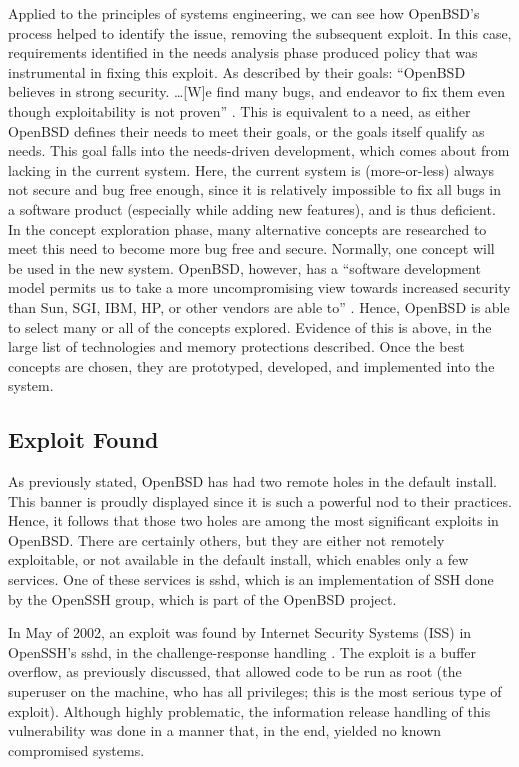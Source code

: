 \documentclass[12pt]{article}
\begin{document}
{Applied to the principles of systems engineering, we can see how OpenBSD's process helped to identify the issue, removing the subsequent exploit. In this case, requirements identified in the needs analysis phase produced policy that was instrumental in fixing this exploit. As described by their goals: ``OpenBSD believes in strong security. \ldots [W]e find many bugs, and endeavor to fix them even though exploitability is not proven'' \cite{openbsd-security}. This is equivalent to a need, as either OpenBSD defines their needs to meet their goals, or the goals itself qualify as needs. This goal falls into the needs-driven development, which comes about from lacking in the current system. Here, the current system is (more-or-less) always not secure and bug free enough, since it is relatively impossible to fix all bugs in a software product (especially while adding new features), and is thus deficient. In the concept exploration phase, many alternative concepts are researched to meet this need to become more bug free and secure. Normally, one concept will be used in the new system. OpenBSD, however, has a ``software development model permits us to take a more uncompromising view towards increased security than Sun, SGI, IBM, HP, or other vendors are able to'' \cite{openbsd-security}. Hence, OpenBSD is able to select many or all of the concepts explored. Evidence of this is above, in the large list of technologies and memory protections described. Once the best concepts are chosen, they are prototyped, developed, and implemented into the system.

\subsection*{Exploit Found}

As previously stated, OpenBSD has had two remote holes in the default install. This banner is proudly displayed since it is such a powerful nod to their practices. Hence, it follows that those two holes are among the most significant exploits in OpenBSD. There are certainly others, but they are either not remotely exploitable, or not available in the default install, which enables only a few services. One of these services is sshd, which is an implementation of SSH done by the OpenSSH group, which is part of the OpenBSD project.

In May of 2002, an exploit was found by Internet Security Systems (ISS) in OpenSSH's sshd, in the challenge-response handling \cite{openssh-cve}. The exploit is a buffer overflow, as previously discussed, that allowed code to be run as root (the superuser on the machine, who has all privileges; this is the most serious type of exploit). Although highly problematic, the information release handling of this vulnerability was done in a manner that, in the end, yielded no known compromised systems.

}
\end{document}
